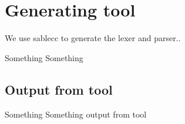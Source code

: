 \chapter{Generating tool}

We use sablecc to generate the lexer and parser..

Something Something

\section{Output from tool}

Something Something output from tool